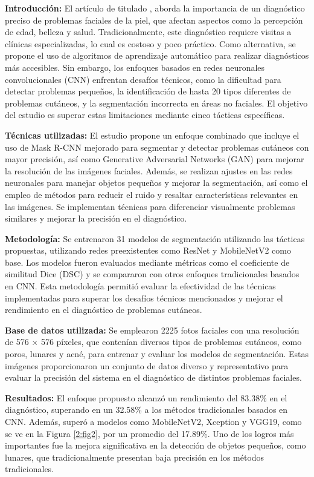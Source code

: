\textbf{Introducción:}
El artículo de \cite{Kim2023} titulado , aborda la importancia de un diagnóstico preciso de problemas faciales de la piel, que afectan aspectos como la percepción de edad, belleza y salud. Tradicionalmente, este diagnóstico requiere visitas a clínicas especializadas, lo cual es costoso y poco práctico. Como alternativa, se propone el uso de algoritmos de aprendizaje automático para realizar diagnósticos más accesibles. Sin embargo, los enfoques basados en redes neuronales convolucionales (CNN) enfrentan desafíos técnicos, como la dificultad para detectar problemas pequeños, la identificación de hasta 20 tipos diferentes de problemas cutáneos, y la segmentación incorrecta en áreas no faciales. El objetivo del estudio es superar estas limitaciones mediante cinco tácticas específicas.

\textbf{Técnicas utilizadas:}
El estudio propone un enfoque combinado que incluye el uso de Mask R-CNN mejorado para segmentar y detectar problemas cutáneos con mayor precisión, así como Generative Adversarial Networks (GAN) para mejorar la resolución de las imágenes faciales. Además, se realizan ajustes en las redes neuronales para manejar objetos pequeños y mejorar la segmentación, así como el empleo de métodos para reducir el ruido y resaltar características relevantes en las imágenes. Se implementan técnicas para diferenciar visualmente problemas similares y mejorar la precisión en el diagnóstico.

\textbf{Metodología:}
Se entrenaron 31 modelos de segmentación utilizando las tácticas propuestas, utilizando redes preexistentes como ResNet y MobileNetV2 como base. Los modelos fueron evaluados mediante métricas como el coeficiente de similitud Dice (DSC) y se compararon con otros enfoques tradicionales basados en CNN. Esta metodología permitió evaluar la efectividad de las técnicas implementadas para superar los desafíos técnicos mencionados y mejorar el rendimiento en el diagnóstico de problemas cutáneos.

\textbf{Base de datos utilizada:}
Se emplearon 2225 fotos faciales con una resolución de 576 × 576 píxeles, que contenían diversos tipos de problemas cutáneos, como poros, lunares y acné, para entrenar y evaluar los modelos de segmentación. Estas imágenes proporcionaron un conjunto de datos diverso y representativo para evaluar la precisión del sistema en el diagnóstico de distintos problemas faciales.

\textbf{Resultados:}
El enfoque propuesto alcanzó un rendimiento del 83.38\% en el diagnóstico, superando en un 32.58\% a los métodos tradicionales basados en CNN. Además, superó a modelos como MobileNetV2, Xception y VGG19, como se ve en la Figura \ref{2:fig2}, por un promedio del 17.89\%. Uno de los logros más importantes fue la mejora significativa en la detección de objetos pequeños, como lunares, que tradicionalmente presentan baja precisión en los métodos tradicionales.

